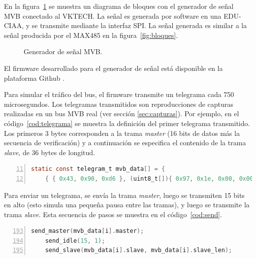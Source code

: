 En la figura~\ref{fig:generador} se muestra un diagrama de bloques con el generador de señal MVB conectado al VKTECH. La señal es generada por software en una EDU-CIAA, y se transmite mediante la interfaz SPI. La señal generada es similar a la señal producida por el MAX485 en la figura~\ref{fig:bloques}.

\begin{figure}[htbp]
	\centering
    {
        \fontsize{8pt}{8pt}\selectfont
        
    }
	\caption{Generador de señal MVB.}
    \label{fig:generador}
\end{figure}

El firmware desarrollado para el generador de señal está disponible en la plataforma Github \cite{mvbgen}.

Para simular el tráfico del bus, el firmware transmite un telegrama cada 750 microsegundos.
Los telegramas transmitidos son reproducciones de capturas realizadas en un bus MVB real (ver sección \ref{sec:capturas}). Por ejemplo, en el código~\ref{cod:telegrama} se muestra la definición del primer telegrama transmitido.
Los primeros 3 bytes corresponden a la trama \textit{master} (16 bits de datos más la secuencia de verificación) y a continuación se especifica el contenido de la trama \textit{slave}, de 36 bytes de longitud.

\begin{lstlisting}[label=cod:telegrama,caption=Definición de un telegrama a transmitir (\texttt{gen.c}).,float=htbp,numberstyle=\footnotesize\ttfamily,language=C,breaklines=true,numbers=left,firstnumber=11,xleftmargin=1cm]
static const telegram_t mvb_data[] = {
    { { 0x43, 0x90, 0xd6 }, (uint8_t[]){ 0x97, 0x1e, 0x00, 0x00, 0x00, 0x82, 0x14, 0x06, 0xdf, 0x1e, 0x0b, 0x31, 0x0f, 0x00, 0x17, 0x05, 0x8c, 0xf8, 0x00, 0x00, 0x00, 0x00, 0x00, 0x00, 0x03, 0x4d, 0xc9, 0x11, 0x94, 0x11, 0xa8, 0x11, 0xa8, 0x04, 0x05, 0x88 }, 36 },
\end{lstlisting}

Para enviar un telegrama, se envía la trama \textit{master}, luego se transmiten 15 bits en alto (esto simula una pequeña pausa entre las tramas), y luego se transmite la trama \textit{slave}. Esta secuencia de pasos se muestra en el código~\ref{cod:send}.

\begin{lstlisting}[label=cod:send,caption=Secuencia de pasos para transmitir un telegrama (\texttt{gen.c}).,float=htbp,numberstyle=\footnotesize\ttfamily,language=C,breaklines=true,numbers=left,firstnumber=193,xleftmargin=1cm]
    send_master(mvb_data[i].master);
    send_idle(15, 1);
    send_slave(mvb_data[i].slave, mvb_data[i].slave_len);
\end{lstlisting}

